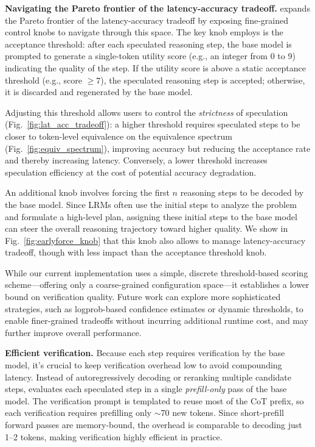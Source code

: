 \textbf{Navigating the Pareto frontier of the latency-accuracy tradeoff.} \name{} expands the Pareto frontier of the latency-accuracy tradeoff by exposing fine-grained control knobs to navigate through this space. The key knob \name{} employs is the acceptance threshold: after each speculated reasoning step, the base model is prompted to generate a single-token utility score (e.g., an integer from 0 to 9) indicating the quality of the step. If the utility score is above a static acceptance threshold (e.g., score $\geq 7$), the speculated reasoning step is accepted; otherwise, it is discarded and regenerated by the base model.

Adjusting this threshold allows users to control the {\em strictness} of speculation (Fig.~\ref{fig:lat_acc_tradeoff}): a higher threshold requires speculated steps to be closer to token-level equivalence on the equivalence spectrum (Fig.~\ref{fig:equiv_spectrum}), improving accuracy but reducing the acceptance rate and thereby increasing latency. Conversely, a lower threshold increases speculation efficiency at the cost of potential accuracy degradation.

An additional knob involves forcing the first $n$ reasoning steps to be decoded by the base model. Since LRMs often use the initial steps to analyze the problem and formulate a high-level plan, assigning these initial steps to the base model can steer the overall reasoning trajectory toward higher quality.
We show in Fig.~\ref{fig:earlyforce_knob} that this knob also allows \name{} to manage latency-accuracy tradeoff, though with less impact than the acceptance threshold knob.


While our current implementation uses a simple, discrete threshold-based scoring scheme---offering only a coarse-grained configuration space---it establishes a lower bound on verification quality. 
Future work can explore more sophisticated strategies, such as logprob-based confidence estimates or dynamic thresholds, to enable finer-grained tradeoffs without incurring additional runtime cost, and may further improve overall performance.










\textbf{Efficient verification.} Because each step requires verification by the base model, it's crucial to keep verification overhead low to avoid compounding latency. 
Instead of autoregressively decoding or reranking multiple candidate steps, \name{} evaluates each speculated step in a single \textit{prefill-only} pass of the base model. The verification prompt is templated to reuse most of the CoT prefix, so each verification requires prefilling only $\sim$70 new tokens. Since short-prefill forward passes are memory-bound, the overhead is comparable to decoding just 1–2 tokens, making verification highly efficient in practice.

